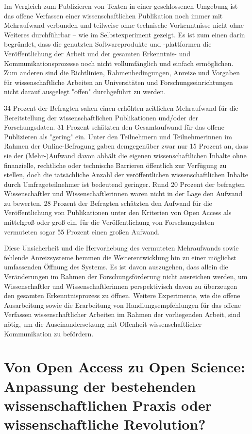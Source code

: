 Im Vergleich zum Publizieren von Texten in einer geschlossenen Umgebung ist das offene Verfassen einer wissenschaftlichen Publikation noch immer mit Mehraufwand verbunden und teilweise ohne technische Vorkenntnisse nicht ohne Weiteres durchführbar – wie im Selbstexperiment gezeigt. Es ist zum einen darin begründet, dass die genutzten Softwareprodukte und -plattformen die Veröffentlichung der Arbeit und der gesamten Erkenntnis- und Kommunikationsprozesse noch nicht vollumfänglich und einfach ermöglichen. Zum anderen sind die Richtlinien, Rahmenbedingungen, Anreize und Vorgaben für wissenschaftliche Arbeiten an Universitäten und Forschungseinrichtungen nicht darauf ausgelegt "offen" durchgeführt zu werden.

34 Prozent der Befragten sahen einen erhöhten zeitlichen Mehraufwand für die Bereitstellung der wissenschaftlichen Publikationen und/oder der Forschungsdaten. 31 Prozent schätzten den Gesamtaufwand für das offene Publizieren als "gering" ein. Unter den Teilnehmern und Teilnehmerinnen im Rahmen der Online-Befragung gaben demgegenüber zwar nur 15 Prozent an, dass sie der (Mehr-)Aufwand davon abhält die eigenen wissenschaftlichen Inhalte ohne finanzielle, rechtliche oder technische Barrieren öffentlich zur Verfügung zu stellen, doch die tatsächliche Anzahl der veröffentlichen wissenschaftlichen Inhalte durch Umfrageteilnehmer ist bedeutend geringer. Rund 20 Prozent der befragten Wissenschaftler und Wissenschaftlerinnen waren nicht in der Lage den Aufwand zu bewerten. 28 Prozent der Befragten schätzten den Aufwand für die Veröffentlichung von Publikationen unter den Kriterien von Open Access als mittelgroß oder groß ein, für die Veröffentlichung von Forschungsdaten vermuteten sogar 55 Prozent einen großen Aufwand.

Diese Unsicherheit und die Hervorhebung des vermuteten Mehraufwands sowie fehlende Anreizsysteme hemmen die Weiterentwicklung hin zu einer möglichst umfassenden Öffnung des Systems. Es ist davon auszugehen, dass allein die Veränderungen im Rahmen der Forschungsförderung nicht ausreichen werden, um Wissenschaftler und Wissenschaftlerinnen perspektivisch davon zu überzeugen den gesamten Erkenntnisprozess zu öffnen. Weitere Experimente, wie die offene Ausarbeitung sowie die Erarbeitung von Handlungsempfehlungen für das offene Verfassen wissenschaftlicher Arbeiten im Rahmen der vorliegenden Arbeit, sind nötig, um die Auseinandersetzung mit Offenheit wissenschaftlicher Kommunikation zu befördern.

\section{Von Open Access zu Open Science: Anpassung der bestehenden wissenschaftlichen Praxis oder wissenschaftliche Revolution?}

